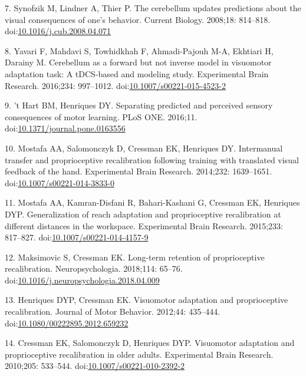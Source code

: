 \documentclass[10pt,letterpaper]{article}
\begin{document}
\hypertarget{ref-Synofzik2008}{}
7. Synofzik M, Lindner A, Thier P. The cerebellum updates predictions
about the visual consequences of one's behavior. Current Biology.
2008;18: 814--818.
doi:\href{https://doi.org/10.1016/j.cub.2008.04.071}{10.1016/j.cub.2008.04.071}

\hypertarget{ref-Yavari2016}{}
8. Yavari F, Mahdavi S, Towhidkhah F, Ahmadi-Pajouh M-A, Ekhtiari H,
Darainy M. Cerebellum as a forward but not inverse model in visuomotor
adaptation task: A tDCS-based and modeling study. Experimental Brain
Research. 2016;234: 997--1012.
doi:\href{https://doi.org/10.1007/s00221-015-4523-2}{10.1007/s00221-015-4523-2}

\hypertarget{ref-Hart2016}{}
9. 't Hart BM, Henriques DY. Separating predicted and perceived sensory
consequences of motor learning. PLoS ONE. 2016;11.
doi:\href{https://doi.org/10.1371/journal.pone.0163556}{10.1371/journal.pone.0163556}

\hypertarget{ref-Mostafa2014}{}
10. Mostafa AA, Salomonczyk D, Cressman EK, Henriques DY. Intermanual
transfer and proprioceptive recalibration following training with
translated visual feedback of the hand. Experimental Brain Research.
2014;232: 1639--1651.
doi:\href{https://doi.org/10.1007/s00221-014-3833-0}{10.1007/s00221-014-3833-0}

\hypertarget{ref-Mostafa2015}{}
11. Mostafa AA, Kamran-Disfani R, Bahari-Kashani G, Cressman EK,
Henriques DYP. Generalization of reach adaptation and proprioceptive
recalibration at different distances in the workspace. Experimental
Brain Research. 2015;233: 817--827.
doi:\href{https://doi.org/10.1007/s00221-014-4157-9}{10.1007/s00221-014-4157-9}

\hypertarget{ref-Maksimovic2018}{}
12. Maksimovic S, Cressman EK. Long-term retention of proprioceptive
recalibration. Neuropsychologia. 2018;114: 65--76.
doi:\href{https://doi.org/10.1016/j.neuropsychologia.2018.04.009}{10.1016/j.neuropsychologia.2018.04.009}

\hypertarget{ref-Henriques2012}{}
13. Henriques DYP, Cressman EK. Visuomotor adaptation and proprioceptive
recalibration. Journal of Motor Behavior. 2012;44: 435--444.
doi:\href{https://doi.org/10.1080/00222895.2012.659232}{10.1080/00222895.2012.659232}

\hypertarget{ref-Cressman2010a}{}
14. Cressman EK, Salomonczyk D, Henriques DYP. Visuomotor adaptation and
proprioceptive recalibration in older adults. Experimental Brain
Research. 2010;205: 533--544.
doi:\href{https://doi.org/10.1007/s00221-010-2392-2}{10.1007/s00221-010-2392-2}
\end{document}
